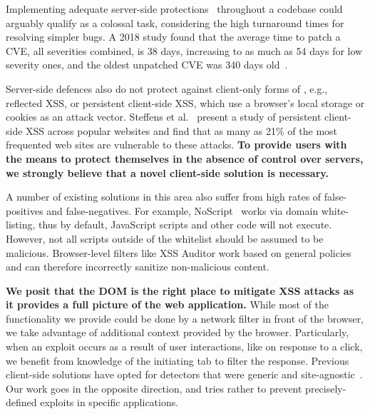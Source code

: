 Implementing adequate server-side protections~\cite{Xu:2006:TPE:1267336.1267345,DBLP:conf/sec/Nguyen-TuongGGSE05,Pietraszek:2005:DAI:2146257.2146267,Bisht:2008:XPD:1428322.1428325} throughout a codebase could arguably qualify as a colossal task, considering the high turnaround times for resolving simpler bugs. A 2018 study found that the average time to patch a \ac{CVE}, all severities combined, is 38 days, increasing to as much as 54 days for low severity ones, and the oldest unpatched \ac{CVE} was 340
days old~\cite{Rapid7}.



Server-side defences also do not protect against client-only forms of
\xss, e.g., reflected \ac{XSS}, or persistent
client-side \ac{XSS}, which use a browser's local storage or cookies
as an attack vector. Steffens et
al.~\cite{DBLP:conf/ndss/SteffensRJS19} present a study of persistent
client-side \ac{XSS} across popular websites and find that as many as
21\% of the most frequented web sites are vulnerable to these attacks.
%
\textbf{To provide users with the means to protect themselves in the absence
of control over servers, we strongly believe that a novel client-side
solution is necessary.}

A number of existing solutions in this area also suffer from high
rates of false-positives and false-negatives. %
For example, NoScript~\cite{Noscript} works via domain white-listing, thus by
default, JavaScript scripts and other code will not execute. However,
not all scripts outside of the whitelist should be assumed to be
malicious. Browser-level filters like XSS Auditor work based on
general policies and can therefore incorrectly sanitize non-malicious
content.

\textbf{We posit that the DOM is the right place to mitigate XSS
  attacks as it provides a full picture of the web application.} While
most of the functionality we provide could be done by a network filter
in front of the browser, we take advantage of additional context
provided by the browser.
%
Particularly, when an exploit occurs as a result of user interactions,
like on response to a click, we
benefit from knowledge of the initiating tab to filter the
response. Previous client-side solutions have opted for detectors that were generic and site-agnostic~\cite{Kirda:2009:CCS:2639535.2639808,Jim:2007:DSI:1242572.1242654,Hallaraker:2005:DMJ:1078029.1078861}. Our work goes in the opposite direction, and tries rather to prevent precisely-defined exploits in specific applications.

